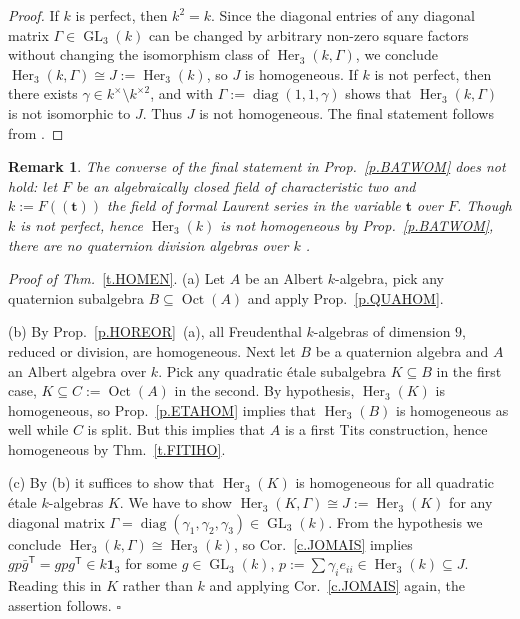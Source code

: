 \documentclass{amsart}
\newtheorem{rem}[equation]{Remark}
\theoremstyle{definition} %
\theoremstyle{remark} %
\DeclareMathOperator{\diag}{diag}
\newcommand{\Eins}{\mathrm{\mathbf{1}}}
\newcommand{\trans}{\mathsf{T}}
\newcommand{\bft}{\mathbf{t}}
\DeclareMathOperator{\Oct}{Oct}
\renewcommand{\:}{\colon\,}
\DeclareMathOperator{\Her}{Her}
\DeclareMathOperator{\GL}{GL}
\numberwithin{equation}{section}
\begin{document}
\begin{proof}
If $k$ is perfect, then $k^2 = k$. Since the diagonal entries of any diagonal matrix $\Gamma \in \GL_3(k)$ can be changed by arbitrary non-zero square factors without changing the isomorphism class of $\Her_3(k,\Gamma)$, we conclude $\Her_3(k,\Gamma) \cong J := \Her_3(k)$, so $J$ is homogeneous. If $k$ is not perfect, then there exists $\gamma \in k^\times \setminus k^{\times 2}$, and \cite[Example~39.35]{MR4806163}    with $\Gamma := \diag(1,1,\gamma)$ shows that $\Her_3(k,\Gamma)$ is not isomorphic to $J$. Thus $J$ is not homogeneous. The final statement follows from \cite[Exc.~19.27]{MR4806163}.
\end{proof}

\begin{rem}
\emph{The converse of the final statement in Prop.~\ref{p.BATWOM} does not hold: let $F$ be an algebraically closed field of characteristic two and $k := F((\bft))$ the field of formal Laurent series in the variable $\bft$ over $F$. Though $k$ is not perfect, hence $\Her_3(k)$ is not homogeneous by Prop.~\ref{p.BATWOM}, there are no quaternion division algebras over $k$ \cite[Props.~1, 2]{MR364380}.}   
\end{rem}

\noindent \emph{Proof of Thm.~}\ref{t.HOMEN}. (a) Let $A$ be an Albert $k$-algebra, pick any quaternion subalgebra $B \subseteq \Oct(A)$ and apply Prop.~\ref{p.QUAHOM}. 

(b) By Prop.~\ref{p.HOREOR}~(a), all Freudenthal $k$-algebras of dimension $9$, reduced or division, are homogeneous. Next let $B$ be a quaternion algebra and $A$ an Albert algebra over $k$. Pick any quadratic \'etale subalgebra $K \subseteq B$ in the first case, $K \subseteq C := \Oct(A)$ in the second. By hypothesis, $\Her_3(K)$ is homogeneous, so Prop.~\ref{p.ETAHOM} implies that $\Her_3(B)$ is homogeneous as well while $C$ is split. But this implies that $A$ is a first Tits construction, hence homogeneous by Thm.~\ref{t.FITIHO}.

(c) By (b) it suffices to show that $\Her_3(K)$ is homogeneous for all quadratic \'etale $k$-algebras $K$. We have to show $\Her_3(K,\Gamma) \cong J := \Her_3(K)$ for any diagonal matrix $\Gamma = \diag(\gamma_1,\gamma_2,\gamma_3) \in \GL_3(k)$. From the hypothesis we conclude $\Her_3(k,\Gamma) \cong \Her_3(k)$, so Cor.~\ref{c.JOMAIS} implies $gp\bar g^\trans = gpg^\trans \in k\Eins_3$ for some $g \in \GL_3(k)$, $p := \sum \gamma_ie_{ii} \in \Her_3(k) \subseteq J$. Reading this in $K$ rather than $k$ and applying Cor.~\ref{c.JOMAIS} again, the assertion follows. \hfill $\square$
\end{document}
